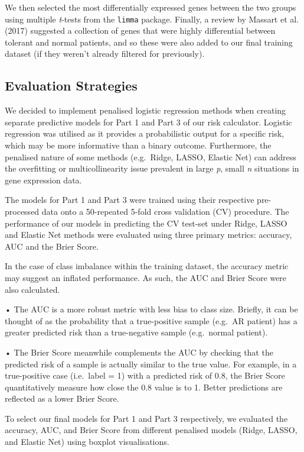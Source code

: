 \documentclass[a4paper,9pt,twocolumn,twoside,]{pinp}
\begin{document}
We then selected the most differentially expressed genes between the two
groups using multiple \emph{t}-tests from the \texttt{limma} package.
Finally, a review by Massart et al. (2017) suggested a collection of
genes that were highly differential between tolerant and normal
patients, and so these were also added to our final training dataset (if
they weren't already filtered for previously).

\hypertarget{evaluation-strategies}{%
\subsection{Evaluation Strategies}\label{evaluation-strategies}}

We decided to implement penalised logistic regression methods when
creating separate predictive models for Part 1 and Part 3 of our risk
calculator. Logistic regression was utilised as it provides a
probabilistic output for a specific risk, which may be more informative
than a binary outcome. Furthermore, the penalised nature of some methods
(e.g.~Ridge, LASSO, Elastic Net) can address the overfitting or
multicollinearity issue prevalent in large \emph{p}, small \emph{n}
situations in gene expression data.

The models for Part 1 and Part 3 were trained using their respective
pre-processed data onto a 50-repeated 5-fold cross validation (CV)
procedure. The performance of our models in predicting the CV test-set
under Ridge, LASSO and Elastic Net methods were evaluated using three
primary metrics: accuracy, AUC and the Brier Score.

In the case of class imbalance within the training dataset, the accuracy
metric may suggest an inflated performance. As such, the AUC and Brier
Score were also calculated.

• The AUC is a more robust metric with less bias to class size. Briefly,
it can be thought of as the probability that a true-positive sample
(e.g.~AR patient) has a greater predicted risk than a true-negative
sample (e.g.~normal patient).

• The Brier Score meanwhile complements the AUC by checking that the
predicted risk of a sample is actually similar to the true value. For
example, in a true-positive case (i.e.~label = 1) with a predicted risk
of 0.8, the Brier Score quantitatively measure how close the 0.8 value
is to 1. Better predictions are reflected as a lower Brier Score.

To select our final models for Part 1 and Part 3 respectively, we
evaluated the accuracy, AUC, and Brier Score from different penalised
models (Ridge, LASSO, and Elastic Net) using boxplot visualisations.
\end{document}
